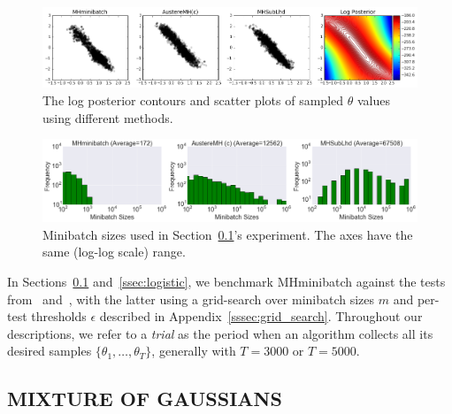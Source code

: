 \documentclass[letterpaper]{article}
\begin{document}
\begin{figure}[t]
    \centering
    \includegraphics[width=1.0\linewidth]{gaussian_mixture_scatter_results_v8.png}
    \caption{
    The log posterior contours and scatter plots of sampled $\theta$ values
    using different methods. 
    }
    \label{fig:gauss_mix_1}
\end{figure}
\begin{figure}[t]
    \centering
    \includegraphics[width=0.9\linewidth]{gaussian_mixture_histogram_results_v8.png}
    \caption{
    Minibatch sizes used in Section~\ref{ssec:gaussians}'s experiment. The axes
    have the same (log-log scale) range.
    }
    \label{fig:gauss_mix_2}
\end{figure}


In Sections~\ref{ssec:gaussians} and~\ref{ssec:logistic}, we benchmark {\sc
MHminibatch} against the tests from~\citep{icml2014c1_bardenet14}
and~\citep{cutting_mh_2014}, with the latter using a grid-search over minibatch
sizes $m$ and per-test thresholds $\epsilon$ described in
Appendix~\ref{sssec:grid_search}. Throughout our descriptions, we refer to a
\emph{trial} as the period when an algorithm collects all its desired samples
$\{\theta_1,\ldots,\theta_T\}$, generally with $T=3000$ or $T=5000$.

\subsection{MIXTURE OF GAUSSIANS}\label{ssec:gaussians}
\end{document}
